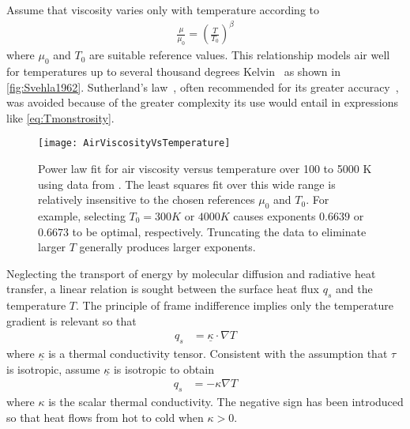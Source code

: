 
Assume that viscosity varies only with temperature according to
\begin{align}
\label{eq:powerlawviscosity}
\frac{\mu}{\mu_{0}}=\left(\frac{T}{T_{0}}\right)^{\beta}
\end{align}
where $\mu_{0}$ and $T_{0}$ are suitable reference values.  This relationship
models air well for temperatures up to several thousand degrees
Kelvin~\citep{NASA-TR-R-132} as shown in \autoref{fig:Svehla1962}.
Sutherland's law~\citep{Sutherland1893Viscosity}, often recommended for its
greater accuracy~\citep[p. 46]{Smits2005Turbulent}, was avoided
because of the greater complexity its use would entail in expressions like
\eqref{eq:Tmonstrosity}.

\begin{figure}[tb]
\centering
\texttt{[image: AirViscosityVsTemperature]}
\caption[Viscosity of air versus temperature from 100 to 5000K]{%
    Power law fit for air viscosity versus temperature over 100 to 5000 K using
    data from \citet{NASA-TR-R-132}.  The least squares fit over this wide range
    is relatively insensitive to the chosen references $\mu_0$ and $T_0$.  For
    example, selecting $T_0 = 300K$ or $4000K$ causes exponents $0.6639$ or
    $0.6673$ to be optimal, respectively.  Truncating the data to eliminate
    larger $T$ generally produces larger exponents.
\label{fig:Svehla1962}
}
\end{figure}


Neglecting the transport of energy by molecular diffusion and radiative heat
transfer, a linear relation is sought between the surface heat flux $q_{s}$ and
the temperature $T$.  The principle of frame indifference implies only the
temperature gradient is relevant so that
\begin{align}
  \label{eq:fouriertensorlaw}
  q_{s} &= \underline{\kappa} \cdot \nabla{} T
\end{align}
where $\underline{\kappa}$ is a thermal conductivity tensor.
Consistent with the assumption that $\tau$ is isotropic, assume
$\underline{\kappa}$ is isotropic to obtain
\begin{align}
  \label{eq:fourierlaw}
  q_{s} &= - \kappa \nabla{} T
\end{align}
where $\kappa$ is the scalar thermal conductivity.  The negative sign has been
introduced so that heat flows from hot to cold when $\kappa>0$.

